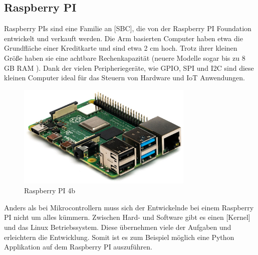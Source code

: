 ﻿\subsection{Raspberry PI}
\label{sec:raspberry_pi}

Raspberry PIs sind eine Familie an [\acs{SBC}], die von der Raspberry PI Foundation entwickelt und verkauft werden. Die \ac{Arm} basierten Computer haben etwa die Grundfläche einer Kreditkarte und sind etwa 2 cm hoch. Trotz ihrer kleinen Größe haben sie eine achtbare Rechenkapazität (neuere Modelle sogar bis zu 8 GB \ac{RAM} ). Dank der vielen Peripheriegeräte, wie \ac{GPIO}, \ac{SPI} und \ac{I2C} sind diese kleinen Computer ideal für das Steuern von Hardware und \ac{IoT} Anwendungen.

\begin{figure}[H]
  \centering
  \includegraphics[width=0.75\textwidth]{images/raspberry_pi_4b}
  \caption{Raspberry PI 4b }
  \label{fig:raspberry_pi_4b}
\end{figure}

Anders als bei Mikrocontrollern muss sich der Entwickelnde bei einem Raspberry PI nicht um alles kümmern. Zwischen Hard- und Software gibt es einen [Kernel] und das Linux Betriebssystem. Diese übernehmen viele der Aufgaben und erleichtern die Entwicklung. Somit ist es zum Beispiel möglich eine Python Applikation auf dem Raspberry PI auszuführen.
